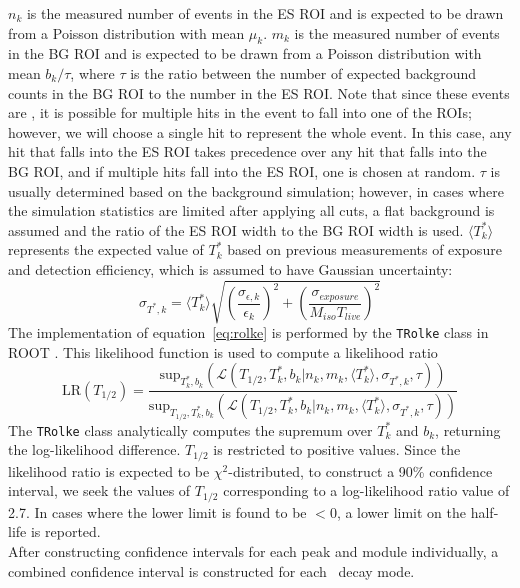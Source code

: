 \documentclass[/main.tex]{subfiles}
\begin{document}
$n_k$ is the measured number of events in the ES ROI and is expected to be drawn from a Poisson distribution with mean $\mu_k$.
$m_k$ is the measured number of events in the BG ROI and is expected to be drawn from a Poisson distribution with mean $b_k/\tau$, where $\tau$ is the ratio between the number of expected background counts in the BG ROI to the number in the ES ROI.
Note that since these events are \msmd, it is possible for multiple hits in the event to fall into one of the ROIs; however, we will choose a single hit to represent the whole event.
In this case, any hit that falls into the ES ROI takes precedence over any hit that falls into the BG ROI, and if multiple hits fall into the ES ROI, one is chosen at random.
$\tau$ is usually determined based on the background simulation; however, in cases where the simulation statistics are limited after applying all cuts, a flat background is assumed and the ratio of the ES ROI width to the BG ROI width is used.
$\langle T^*_k\rangle$ represents the expected value of $T^*_k$ based on previous measurements of exposure and detection efficiency, which is assumed to have Gaussian uncertainty:
\begin{equation}
  \sigma_{T^*,k} = \langle T^*_k\rangle\sqrt{(\frac{\sigma_{\epsilon,k}}{\epsilon_k })^2 + (\frac{\sigma_{exposure}}{M_{iso}T_{live} })^2}
\end{equation}
The implementation of equation~\ref{eq:rolke} is performed by the \texttt{TRolke} class in ROOT \cite{rolke2005}.
This likelihood function is used to compute a likelihood ratio
\begin{equation}
  \mathrm{LR}(T_{1/2}) = \frac{\mathrm{sup}_{T^*_k,b_k}(\mathcal{L}(T_{1/2},T^*_k,b_k|n_k,m_k,\langle T^*_k\rangle, \sigma_{T^*,k},\tau))}{\mathrm{sup}_{T_{1/2},T^*_k,b_k}(\mathcal{L}(T_{1/2},T^*_k,b_k|n_k,m_k,\langle T^*_k\rangle, \sigma_{T^*,k},\tau))}
\end{equation}
The \texttt{TRolke} class analytically computes the supremum over $T^*_k$ and $b_k$, returning the log-likelihood difference.
$T_{1/2}$ is restricted to positive values.
Since the likelihood ratio is expected to be $\chi^2$-distributed, to construct a 90\% confidence interval, we seek the values of $T_{1/2}$ corresponding to a log-likelihood ratio value of 2.7.
In cases where the lower limit is found to be $<0$, a lower limit on the half-life is reported.
\\
After constructing confidence intervals for each peak and module individually, a combined confidence interval is constructed for each \bbes\ decay mode.
\end{document}
